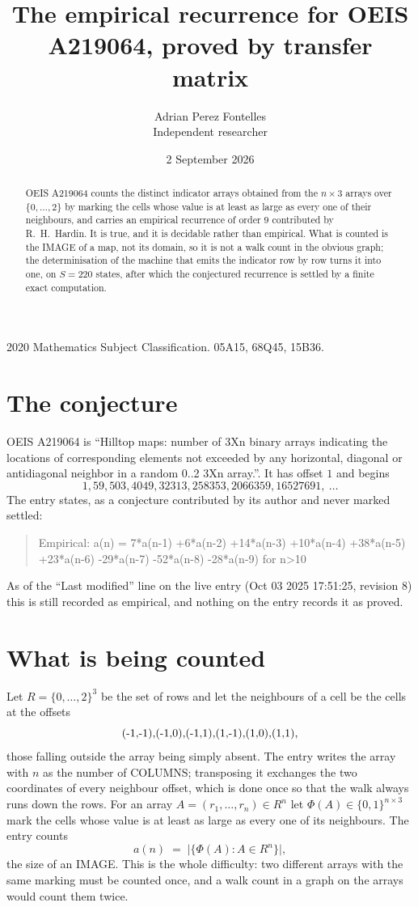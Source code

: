 \documentclass[11pt,a4paper]{article}
\title{The empirical recurrence for OEIS A219064, proved by transfer matrix}
\author{Adrian Perez Fontelles\\ \small Independent researcher}
\date{2 September 2026}
\theoremstyle{plain}
\theoremstyle{definition}
\begin{document}
\maketitle

\begin{abstract}
OEIS A219064 counts the distinct indicator arrays obtained from the $n\times3$ arrays over
$\{0,\dots,2\}$ by marking the cells whose value is at least as large as every one of their neighbours, and carries an
empirical recurrence of order $9$ contributed by R.~H.~Hardin. It is true, and it is
decidable rather than empirical. What is counted is the IMAGE of a map, not its domain, so it
is not a walk count in the obvious graph; the determinisation of the machine that emits the
indicator row by row turns it into one, on $S=220$ states, after which the conjectured
recurrence is settled by a finite exact computation.
\end{abstract}

\noindent\small 2020 Mathematics Subject Classification. 05A15, 68Q45, 15B36.\normalsize

\section{The conjecture}

OEIS A219064 is ``Hilltop maps: number of 3Xn binary arrays indicating the locations of corresponding elements not exceeded by any horizontal, diagonal or antidiagonal neighbor in a random 0..2 3Xn array.''. It has offset $1$ and begins
\[
1, 59, 503, 4049, 32313, 258353, 2066359, 16527691,\ \dots
\]
The entry states, as a conjecture contributed by its author and never marked settled:
\begin{quote}
Empirical: a(n) = 7*a(n-1) +6*a(n-2) +14*a(n-3) +10*a(n-4) +38*a(n-5) +23*a(n-6) -29*a(n-7) -52*a(n-8) -28*a(n-9) for n>10
\end{quote}
As of the ``Last modified'' line on the live entry (Oct 03 2025 17:51:25, revision 8) this is still
recorded as empirical, and nothing on the entry records it as proved.

\section{What is being counted}

Let $R=\{0,\dots,2\}^{3}$ be the set of rows and let the neighbours of a cell be the
cells at the offsets
\[
$(-1,-1)$, $(-1,0)$, $(-1,1)$, $(1,-1)$, $(1,0)$, $(1,1)$,
\]
those falling outside the array being simply absent. The entry writes the array with $n$ as the number of COLUMNS; transposing it exchanges the two coordinates of every neighbour offset, which is done once so that the walk always runs down the rows. For an array
$A=(r_1,\dots,r_n)\in R^n$ let $\Phi(A)\in\{0,1\}^{n\times3}$ mark the cells whose value
is at least as large as every one of its neighbours. The entry counts
\[
a(n)\;=\;\bigl|\{\Phi(A):A\in R^n\}\bigr| ,
\]
the size of an IMAGE. This is the whole difficulty: two different arrays with the same marking
must be counted once, and a walk count in a graph on the arrays would count them twice.
\end{document}
